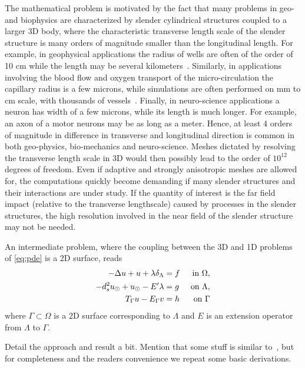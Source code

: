 \documentclass[r]{siamart171218}
\newcommand{\kent}[1]{{\color{blue}#1}}
\begin{document}
The mathematical problem is motivated by the fact that many problems in geo- and biophysics are characterized by slender cylindrical structures coupled to a larger 3D body, where the characteristic transverse length scale of the slender structure is many orders of magnitude smaller than the longitudinal length.  For example, in geophysical applications the radius of wells are often of the order of 10 cm while the length may be several kilometers~\cite{gjerde2019singularity}. Similarly, in applications involving the blood flow and oxygen transport of the micro-circulation the capillary radius is a few microns, while simulations are often performed on mm to cm scale, with thousands of vessels~\cite{berg2020modelling,fang2008oxygen,gould2017capillary}. Finally, in neuro-science applications a neuron has width of a few microns, while  its length is much longer. For example, an axon of a motor neurons may be as long as a meter.  Hence,  at least 4 orders of magnitude in difference in transverse and longitudinal direction is common in both geo-physics, bio-mechanics and neuro-science. Meshes dictated by resolving the transverse length scale in 3D would then possibly lead to the order of $10^{12}$ degrees of freedom. Even if adaptive and strongly anisotropic meshes are allowed for, the computations quickly become demanding if many slender structures and their interactions are under study.  If the quantity of interest is the far field impact (relative to the transverse lengthscale) caused by processes in the slender structures, the high resolution involved in the near field of the slender structure may not be needed.  

An intermediate problem, where the coupling between the 3D and 1D problems of \eqref{eq:pde} is a 2D surface, reads 
\begin{subequations}
\label{inteq:pde}
\begin{align}
\label{inteq:pde1}
  -\Delta u + u + \lambda \delta_{\Lambda} &= f &\mbox{ in } \Omega,\\
\label{inteq:pde2}
-d_s^2 \ud + \ud - E' \lambda  &= g &\mbox{ on } \Lambda,\\
\label{inteq:coupling}
T_\Gamma u - E_\Gamma v  &=  h &\mbox{ on } \Gamma
\end{align}
\end{subequations}
where $\Gamma \subset \Omega$ is a 2D surface corresponding to $\Lambda$
and $E$ is an extension operator from $\Lambda$ to $\Gamma$. 



\kent{
Detail the approach and result a bit.
Mention that some stuff is 
similar to~\cite{laurino_m2an}, but for completeness and the readers convenience we repeat some basic derivations. 
}
\end{document}
